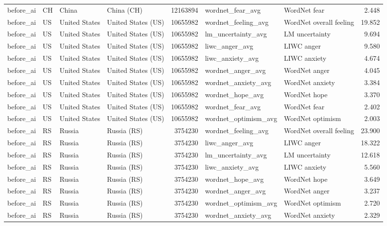 \begin{tabular}{llllrllr}
before\_ai & CH & China & China (CH) & 12163894 & wordnet\_fear\_avg & WordNet fear & 2.448 \\
before\_ai & US & United States & United States (US) & 10655982 & wordnet\_feeling\_avg & WordNet overall feeling & 19.852 \\
before\_ai & US & United States & United States (US) & 10655982 & lm\_uncertainty\_avg & LM uncertainty & 9.694 \\
before\_ai & US & United States & United States (US) & 10655982 & liwc\_anger\_avg & LIWC anger & 9.580 \\
before\_ai & US & United States & United States (US) & 10655982 & liwc\_anxiety\_avg & LIWC anxiety & 4.674 \\
before\_ai & US & United States & United States (US) & 10655982 & wordnet\_anger\_avg & WordNet anger & 4.045 \\
before\_ai & US & United States & United States (US) & 10655982 & wordnet\_anxiety\_avg & WordNet anxiety & 3.384 \\
before\_ai & US & United States & United States (US) & 10655982 & wordnet\_hope\_avg & WordNet hope & 3.370 \\
before\_ai & US & United States & United States (US) & 10655982 & wordnet\_fear\_avg & WordNet fear & 2.402 \\
before\_ai & US & United States & United States (US) & 10655982 & wordnet\_optimism\_avg & WordNet optimism & 2.003 \\
before\_ai & RS & Russia & Russia (RS) & 3754230 & wordnet\_feeling\_avg & WordNet overall feeling & 23.900 \\
before\_ai & RS & Russia & Russia (RS) & 3754230 & liwc\_anger\_avg & LIWC anger & 18.322 \\
before\_ai & RS & Russia & Russia (RS) & 3754230 & lm\_uncertainty\_avg & LM uncertainty & 12.618 \\
before\_ai & RS & Russia & Russia (RS) & 3754230 & liwc\_anxiety\_avg & LIWC anxiety & 5.560 \\
before\_ai & RS & Russia & Russia (RS) & 3754230 & wordnet\_hope\_avg & WordNet hope & 3.649 \\
before\_ai & RS & Russia & Russia (RS) & 3754230 & wordnet\_anger\_avg & WordNet anger & 3.237 \\
before\_ai & RS & Russia & Russia (RS) & 3754230 & wordnet\_optimism\_avg & WordNet optimism & 2.720 \\
before\_ai & RS & Russia & Russia (RS) & 3754230 & wordnet\_anxiety\_avg & WordNet anxiety & 2.329 \\

\end{tabular}
